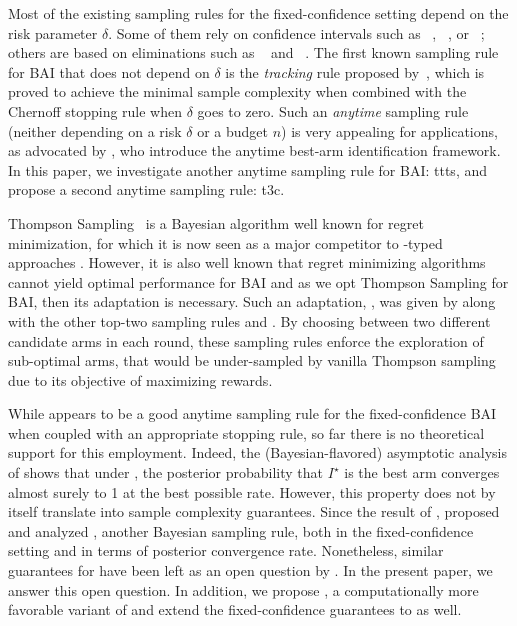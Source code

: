 Most of the existing sampling rules for the fixed-confidence setting depend on the risk parameter $\delta$. Some of them rely on confidence intervals such as \LUCB~\citep{kalyanakrishnan2012lucb}, \UGapE~\citep{gabillon2012ugape}, 
or \LIL~\citep{jamieson2014lilucb}; others are based on eliminations such as \SE~\citep{even-dar2003confidence} and \EGE~\citep{karnin2013sha}. The first known sampling rule for BAI that does not depend on $\delta$ is the \emph{tracking} rule proposed by~\cite{garivier2016tracknstop}, which is proved to achieve the minimal sample complexity when combined with the Chernoff stopping rule when $\delta$ goes to zero. Such an \emph{anytime} sampling rule (neither depending on a risk $\delta$ or a budget $n$) is very appealing for applications, as advocated by \cite{jun2016atlucb}, who introduce the anytime best-arm identification framework. In this paper, we investigate another anytime sampling rule for BAI: \gls{ttts}, and propose a second anytime sampling rule: \gls{t3c}.


Thompson Sampling~\citep{thompson1933} is a Bayesian algorithm well known for regret minimization, for which it is now seen as a major competitor to \UCB-typed approaches \citep{burnetas1996optimal,auer2002ucb,cappe2013klucb}. However, it is also well known that regret minimizing algorithms cannot yield optimal performance for BAI \citep{bubeck2011pure,kaufmann2017survey} and as we opt Thompson Sampling for BAI, then its adaptation is necessary. Such an adaptation, \TTTS, was given by \citet{russo2016ttts} along with the other top-two sampling rules \TTPS and \TTVS. By choosing between two different candidate arms in each round, these sampling rules enforce the exploration of sub-optimal arms, that would be under-sampled by vanilla Thompson sampling due to its objective of maximizing rewards.

While \TTTS appears to be a good anytime sampling rule for the fixed-confidence BAI when coupled with an appropriate stopping rule, so far there is no theoretical support for this employment. Indeed, the (Bayesian-flavored) asymptotic analysis of \cite{russo2016ttts} shows that under \TTTS, the posterior probability that $I^\star$ is the best arm converges almost surely to 1 at the best possible rate. However, this property does not by itself translate into sample complexity guarantees. Since the result of \cite{russo2016ttts}, \citet{qin2017ttei} proposed and analyzed \TTEI, another Bayesian sampling rule, both in the fixed-confidence setting and in terms of posterior convergence rate. Nonetheless, similar guarantees for \TTTS have been left as an open question by \cite{russo2016ttts}. In the present paper, we answer this open question. In addition, we propose \TCC, a computationally more favorable variant of \TTTS and  extend the fixed-confidence guarantees to \TCC as well.


